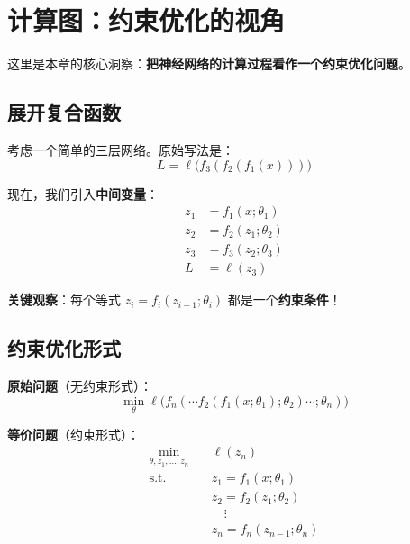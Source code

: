 \section{计算图：约束优化的视角}

这里是本章的核心洞察：\textbf{把神经网络的计算过程看作一个约束优化问题}。

\subsection{展开复合函数}

考虑一个简单的三层网络。原始写法是：
\begin{equation}
L = \ell\big(f_3(f_2(f_1(x)))\big)
\end{equation}

现在，我们引入\textbf{中间变量}：
\begin{align}
z_1 &= f_1(x; \theta_1) \\
z_2 &= f_2(z_1; \theta_2) \\
z_3 &= f_3(z_2; \theta_3) \\
L &= \ell(z_3)
\end{align}

\textbf{关键观察}：每个等式 $z_i = f_i(z_{i-1}; \theta_i)$ 都是一个\textbf{约束条件}！

\subsection{约束优化形式}

\begin{keyformula}[title=神经网络训练的约束优化形式]
\textbf{原始问题}（无约束形式）：
\begin{equation}
\min_\theta \ell\big(f_n(\cdots f_2(f_1(x; \theta_1); \theta_2) \cdots; \theta_n)\big)
\end{equation}

\textbf{等价问题}（约束形式）：
\begin{equation}
\begin{aligned}
\min_{\theta, z_1, \ldots, z_n} \quad & \ell(z_n) \\
\text{s.t.} \quad & z_1 = f_1(x; \theta_1) \\
& z_2 = f_2(z_1; \theta_2) \\
& \quad \vdots \\
& z_n = f_n(z_{n-1}; \theta_n)
\end{aligned}
\end{equation}
\end{keyformula}

